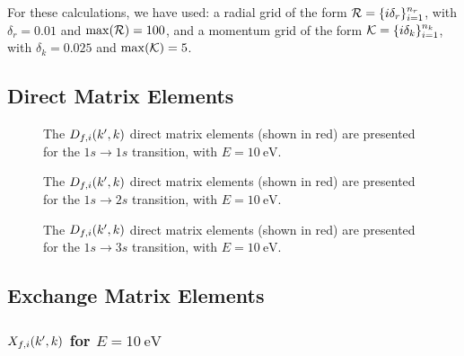 \documentclass{article}
\begin{document}
\clearpage

For these calculations, we have used: a radial grid of the form
$\mathcal{R} = \lbrace i \delta_{r}\rbrace_{i = 1}^{n_{r}}$, with
$\delta_{r} = 0.01$ and $\max(\mathcal{R}) = 100$,
and a momentum grid of the form
$\mathcal{K} = \lbrace i \delta_{k}\rbrace_{i = 1}^{n_{k}}$, with
$\delta_{k} = 0.025$ and $\max(\mathcal{K}) = 5$.

\subsection{Direct Matrix Elements}
\label{sec:dir-me}

\begin{figure}[h]
  \begin{center}
    
  \end{center}
  \caption[Direct Matrix Elements 1s-1s]{
    The $D_{f, i}(k', k)$ direct matrix elements (shown in red) are presented
    for the $1s \to 1s$ transition, with $E = \SI{10}{\eV}$.
  }
  \label{fig:dir-me-1s-1s}
\end{figure}

\begin{figure}[h]
  \begin{center}
    
  \end{center}
  \caption[Direct Matrix Elements 1s-2s]{
    The $D_{f, i}(k', k)$ direct matrix elements (shown in red) are presented
    for the $1s \to 2s$ transition, with $E = \SI{10}{\eV}$.
  }
  \label{fig:dir-me-1s-2s}
\end{figure}

\begin{figure}[h]
  \begin{center}
    
  \end{center}
  \caption[Direct Matrix Elements 1s-3s]{
    The $D_{f, i}(k', k)$ direct matrix elements (shown in red) are presented
    for the $1s \to 3s$ transition, with $E = \SI{10}{\eV}$.
  }
  \label{fig:dir-me-1s-3s}
\end{figure}

\clearpage

\subsection{Exchange Matrix Elements}
\label{sec:exc-me}

\subsubsection{$X_{f, i}(k', k)$ for $E = \SI{10}{\eV}$}
\label{sec:exc-me-10}
\end{document}
